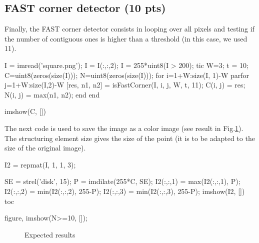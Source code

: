 \subsection{FAST corner detector (10 pts)}
Finally, the FAST corner detector consists in looping over all pixels and testing if the number of contiguous ones is higher than a threshold (in this case, we used 11).
\begin{matlab}
I = imread('square.png'); I = I(:,:,2);
I = 255*uint8(I > 200);
tic
W=3;
t = 10;
C=uint8(zeros(size(I)));
N=uint8(zeros(size(I)));
for i=1+W:size(I, 1)-W
    parfor j=1+W:size(I,2)-W
        [res, n1, n2] = isFastCorner(I, i, j, W, t, 11);
        C(i, j) = res;
        N(i, j) = max(n1, n2);
    end
end

imshow(C, [])
\end{matlab}

The next code is used to save the image as a color image (see result in Fig.\ref{fig:exams:ipr:2019:results}). The structuring element size gives the size of the point (it is to be adapted to the size of the original image).

\begin{matlab}
I2 = repmat(I, 1, 1, 3);

SE = strel('disk', 15);
P = imdilate(255*C, SE);
I2(:,:,1) = max(I2(:,:,1), P);
I2(:,:,2) = min(I2(:,:,2), 255-P);
I2(:,:,3) = min(I2(:,:,3), 255-P);
imshow(I2, [])
toc

figure, imshow(N>=10, []);
\end{matlab}


\begin{figure}[htbp]
 \centering {}\hfill
 
 \caption{Expected results}
 \label{fig:exams:ipr:2019:results}
\end{figure}


